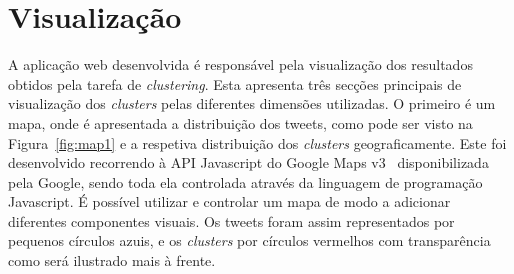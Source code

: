 %

\section{Visualização} \label{sec:visu}

A aplicação web desenvolvida é responsável pela visualização dos resultados obtidos pela tarefa de \textit{clustering}. Esta apresenta três secções principais de visualização dos \textit{clusters} pelas diferentes dimensões utilizadas. O primeiro é um mapa, onde é apresentada a distribuição dos tweets, como pode ser visto na Figura~\ref{fig:map1} e a respetiva distribuição dos \textit{clusters} geograficamente. Este foi desenvolvido recorrendo à API Javascript do Google Maps v3~\cite{googlemapsapi} disponibilizada pela Google, sendo toda ela controlada através da linguagem de programação Javascript. É possível utilizar e controlar um mapa de modo a adicionar diferentes componentes visuais. Os tweets foram assim representados por pequenos círculos azuis, e os \textit{clusters} por círculos vermelhos com transparência como será ilustrado mais à frente. 

